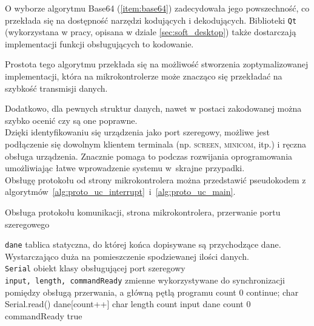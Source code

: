 O wyborze algorytmu Base64 (\ref{item:base64}) zadecydowała jego powszechność, co przekłada się na dostępność narzędzi kodujących i dekodujących.
Biblioteki \texttt{Qt} (wykorzystana w pracy, opisana w dziale \ref{sec:soft_desktop}) także dostarczają implementacji funkcji obsługujących to kodowanie.

Prostota tego algorytmu przekłada się na możliwość stworzenia zoptymalizowanej implementacji, która na mikrokontrolerze może znacząco się przekładać na szybkość transmisji danych.

Dodatkowo, dla pewnych struktur danych, nawet w postaci zakodowanej można szybko ocenić czy są one poprawne.\\

Dzięki identyfikowaniu się urządzenia jako port szeregowy, możliwe jest podłączenie się dowolnym klientem terminala (np. \textsc{screen}, \textsc{minicom}, itp.) i ręczna obsługa urządzenia.
Znacznie pomaga to podczas rozwijania oprogramowania umożliwiając łatwe wprowadzenie systemu w~skrajne przypadki.\\

Obsługę protokołu od strony mikrokontrolera można przedstawić pseudokodem z algorytmów~\ref{alg:proto_uc_interrupt}~i~\ref{alg:proto_uc_main}.
\begin{algorithm}
\caption{Obsługa protokołu komunikacji, strona mikrokontrolera, przerwanie portu szeregowego}
\label{alg:proto_uc_interrupt}
\begin{algorithmic}[1]
  \REQUIRE \texttt{dane} \ppauza tablica statyczna, do której końca dopisywane są przychodzące dane. Wystarczająco duża na pomieszczenie spodziewanej ilości danych.\\
  \texttt{Serial} \ppauza obiekt klasy obsługującej port szeregowy\\
  \texttt{input, length, commandReady} \ppauza zmienne wykorzystywane do synchronizacji pomiędzy obsługą przerwania, a główną pętlą programu
  \STATE count \textleftarrow{} $0$
      \STATE continue;
    \ENDIF
    \STATE char \textleftarrow{} Serial.read()
    \STATE dane[count++] \textleftarrow{} char
      \STATE length \textleftarrow{} count
      \STATE input \textleftarrow{} dane
      \STATE count \textleftarrow{} $0$
      \STATE commandReady \textleftarrow{} true
    \ENDIF
  \ENDWHILE
\end{algorithmic}
\end{algorithm}

